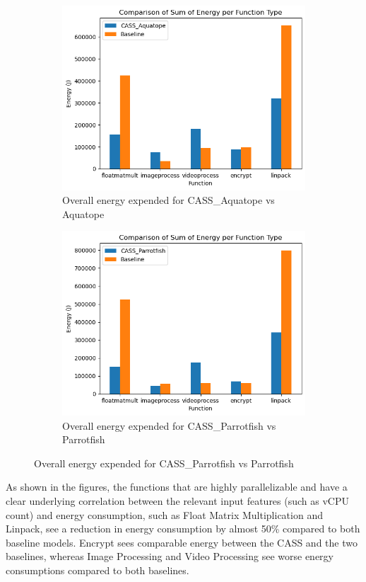 \documentclass[times, 10pt,twocolumn]{article}
\begin{document}
\begin{figure}[H] %
   \centering
   \begin{subfigure}[b]{0.5\textwidth} %
         \centering
         \includegraphics[width=0.6\linewidth]{imgs/final_experiment_plots/energy_comparison/aquatope/overall.png}
         \caption{Overall energy expended for CASS\_Aquatope vs Aquatope}
         \label{fig:cassvsaquatope}
   \end{subfigure}
   \begin{subfigure}[b]{0.5\textwidth} %
         \centering
         \includegraphics[width=0.6\linewidth]{imgs/final_experiment_plots/energy_comparison/parrotfish/overall.png}
         \caption{Overall energy expended for CASS\_Parrotfish vs Parrotfish}
         \label{fig:cassvsparrotfish}
   \end{subfigure}
   \end{figure}

As shown in the figures, the functions that are highly parallelizable and have a clear underlying correlation between the relevant input features (such as vCPU count) and energy consumption, such as Float Matrix Multiplication and Linpack, see a reduction in energy consumption by almost 50\% compared to both baseline models. Encrypt sees comparable energy between the CASS and the two baselines, whereas Image Processing and Video Processing see worse energy consumptions compared to both baselines.
\end{document}

